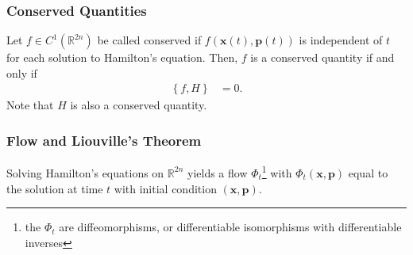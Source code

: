 \documentclass[12pt]{extarticle}
\newcommand{\R}{\mathbb{R}}
\newcommand{\set}[1]{\left\{#1\right\}}
\theoremstyle{plain}
\theoremstyle{definition}
\theoremstyle{remark}
\renewcommand{\newline}{\hfill\break}
\begin{document}
  \subsubsection{Conserved Quantities}%
  Let $f\in C^{1}(\R^{2n})$ be called conserved if $f(\mathbf{x}(t),\mathbf{p}(t))$ is independent of $t$ for each solution to Hamilton's equation. Then, $f$ is a conserved quantity if and only if
  \begin{align*}
    \set{f,H} &= 0.
  \end{align*}
  Note that $H$ is also a conserved quantity.
  \subsubsection{Flow and Liouville's Theorem}%
  Solving Hamilton's equations on $\R^{2n}$ yields a flow $\Phi_t$\footnote{the $\Phi_t$ are diffeomorphisms, or differentiable isomorphisms with differentiable inverses} with $\Phi_t(\mathbf{x},\mathbf{p})$ equal to the solution at time $t$ with initial condition $(\mathbf{x},\mathbf{p})$.\newline
\end{document}

